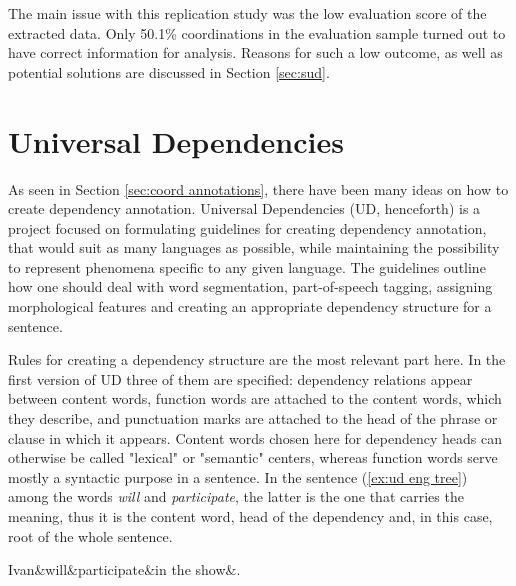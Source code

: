 The main issue with this replication study was the low evaluation score of the extracted data. Only 50.1\% coordinations in the evaluation sample turned out to have correct information for analysis. Reasons for such a low outcome, as well as potential solutions are discussed in Section \ref{sec:sud}.

\section{Universal Dependencies}\label{sec:ud}

As seen in Section \ref{sec:coord annotations}, there have been many ideas on how to create dependency annotation. Universal Dependencies (UD, henceforth) is a project focused on formulating guidelines for creating dependency annotation, that would suit as many languages as possible, while maintaining the possibility to represent phenomena specific to any given language. The guidelines outline how one should deal with word segmentation, part-of-speech tagging, assigning morphological features and creating an appropriate dependency structure for a sentence. 

Rules for creating a dependency structure are the most relevant part here. In the first version of UD \citep{ud1} three of them are specified: dependency relations appear between content words, function words are attached to the content words, which they describe, and punctuation marks are attached to the head of the phrase or clause in which it appears. Content words chosen here for dependency heads can otherwise be called "lexical" or "semantic" centers, whereas function words serve mostly a syntactic purpose in a sentence. In the sentence (\ref{ex:ud eng tree}) among the words \textsl{will} and \textsl{participate}, the latter is the one that carries the meaning, thus it is the content word, head of the dependency and, in this case, root of the whole sentence.

\begin{exe}
    \ex
    \label{ex:ud eng tree}
    \begin{dependency}[theme = simple, baseline=-\the\dimexpr\fontdimen22\textfont2\relax]
        \begin{deptext}
            Ivan\&will\&participate\&in the show\&.\\
        \end{deptext}
    \end{dependency}
\end{exe}

